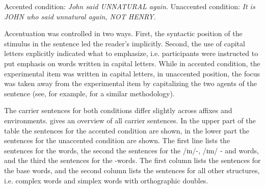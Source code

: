 \begin{exe} 
	\ex \label{example accented condition} Accented condition:  \hspace*{.5cm}\textit{John said UNNATURAL again.}
	\ex \label{example unaccented condition} Unaccented condition: \hspace*{0cm} \textit{It is JOHN who said unnatural again, NOT HENRY.}
\end{exe}

Accentuation was controlled in two ways. First, the syntactic position of the stimulus in the sentence led the reader's  implicitly. Second, the use of capital letters explicitly indicated what to emphasize,  i.e. participants were instructed to put emphasis on words written in capital letters. While in accented condition, the experimental item was written in capital letters, in unaccented position, the focus was taken away from the experimental item by capitalizing  the two agents of the sentence (see, for example, \cite{Plag.2011} for a similar methodology).


The carrier sentences for both conditions differ slightly across affixes and environments.  gives an overview of all carrier sentences. In the upper part of the table the sentences for the accented condition are shown, in the lower part the sentences for the unaccented condition are shown. 
The first line lists the sentences for the words, the second the sentences for the /ɪn/-, /ɪm/ - and words, and the third the sentences for the -words.
The first column lists the sentences for the base words, and the second column lists the sentences for all other structures, i.e. complex words and simplex words with orthographic doubles. 




